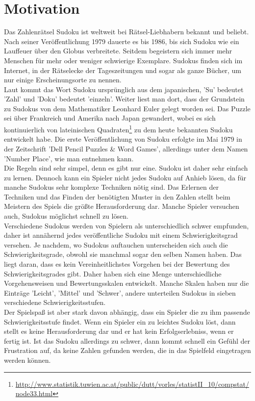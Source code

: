 \section{Motivation}
Das Zahlenrätsel Sudoku ist weltweit bei Rätsel-Liebhabern bekannt und beliebt. Nach seiner Veröffentlichung 1979 dauerte es bis 1986, bis sich Sudoku wie ein Lauffeuer über den Globus verbreitete. Seitdem begeistern sich immer mehr Menschen für mehr oder weniger schwierige Exemplare. Sudokus finden sich im Internet, in der Rätselecke der Tageszeitungen und sogar als ganze Bücher, um nur einige Erscheinungsorte zu nennen. \\
Laut \cite{SuDra:2014:Misc} kommt das Wort Sudoku ursprünglich aus dem japanischen, 'Su' bedeutet 'Zahl' und 'Doku' bedeutet 'einzeln'. Weiter liest man dort, dass der Grundstein zu Sudokus von dem Mathematiker Leonhard Euler gelegt worden sei. Das Puzzle sei über Frankreich und Amerika nach Japan gewandert, wobei es sich kontinuierlich von lateinischen Quadraten\footnote{\url{http://www.statistik.tuwien.ac.at/public/dutt/vorles/statistII_10/compstat/node33.html}} zu dem heute bekannten Sudoku entwickelt habe. Die erste Veröffentlichung von Sudoku erfolgte im Mai 1979 in der Zeitschrift 'Dell Pencil Puzzles \& Word Games', allerdings unter dem Namen 'Number Place', wie man \cite{Wolf2014} entnehmen kann.\\
Die Regeln sind sehr simpel, denn es gibt nur eine. Sudoku ist daher sehr einfach zu lernen. Dennoch kann ein Spieler nicht jedes Sudoku auf Anhieb lösen, da für manche Sudokus sehr komplexe Techniken nötig sind. Das Erlernen der Techniken und das Finden der benötigten Muster in den Zahlen stellt beim Meistern des Spiels die größte Herausforderung dar. Manche Spieler versuchen auch, Sudokus möglichst schnell zu lösen.\\
Verschiedene Sudokus werden von Spielern als unterschiedlich schwer empfunden, daher ist annähernd jedes veröffentliche Sudoku mit einem Schwierigkeitsgrad versehen. Je nachdem, wo Sudokus auftauchen unterscheiden sich auch die Schwierigkeitsgrade, obwohl sie manchmal sogar den selben Namen haben. Das liegt daran, dass es kein Vereinheitlichstes Vorgehen bei der Bewertung des Schwierigkeitsgrades gibt. Daher haben sich eine Menge unterschiedliche Vorgehensweisen und Bewertungsskalen entwickelt. Manche Skalen haben nur die Einträge 'Leicht', 'Mittel' und 'Schwer', andere unterteilen Sudokus in sieben verschiedene Schwierigkeitsstufen.\\
Der Spielspaß ist aber stark davon abhängig, dass ein Spieler die zu ihm passende Schwierigkeitsstufe findet. Wenn ein Spieler ein zu leichtes Sudoku löst, dann stellt es keine Herausforderung dar und er hat kein Erfolgserlebniss, wenn er fertig ist. Ist das Sudoku allerdings zu schwer, dann kommt schnell ein Gefühl der Frustration auf, da keine Zahlen gefunden werden, die in das Spielfeld eingetragen werden können.\\
